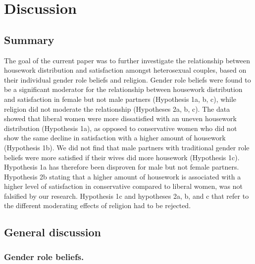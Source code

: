 \documentclass[
  man,floatsintext]{apa6}
\begin{document}
\hypertarget{discussion}{%
\section{Discussion}\label{discussion}}

\hypertarget{summary}{%
\subsection{Summary}\label{summary}}

The goal of the current paper was to further investigate the relationship between housework distribution and satisfaction amongst heterosexual couples, based on their individual gender role beliefs and religion. Gender role beliefs were found to be a significant moderator for the relationship between housework distribution and satisfaction in female but not male partners (Hypothesis 1a, b, c), while religion did not moderate the relationship (Hypotheses 2a, b, c). The data showed that liberal women were more dissatisfied with an uneven housework distribution (Hypothesis 1a), as opposed to conservative women who did not show the same decline in satisfaction with a higher amount of housework (Hypothesis 1b). We did not find that male partners with traditional gender role beliefs were more satisfied if their wives did more housework (Hypothesis 1c).
Hypothesis 1a has therefore been disproven for male but not female partners. Hypothesis 2b stating that a higher amount of housework is associated with a higher level of satisfaction in conservative compared to liberal women, was not falsified by our research. Hypothesis 1c and hypotheses 2a, b, and c that refer to the different moderating effects of religion had to be rejected.

\hypertarget{general-discussion}{%
\subsection{General discussion}\label{general-discussion}}

\hypertarget{gender-role-beliefs.}{%
\subsubsection{Gender role beliefs.}\label{gender-role-beliefs.}}
\end{document}
